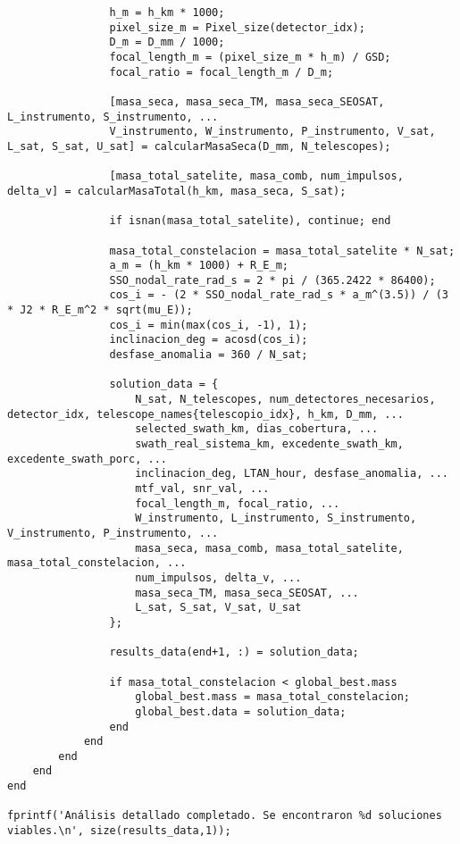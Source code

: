 \begin{verbatim}
                h_m = h_km * 1000;
                pixel_size_m = Pixel_size(detector_idx);
                D_m = D_mm / 1000;
                focal_length_m = (pixel_size_m * h_m) / GSD;
                focal_ratio = focal_length_m / D_m;

                [masa_seca, masa_seca_TM, masa_seca_SEOSAT, L_instrumento, S_instrumento, ...
                V_instrumento, W_instrumento, P_instrumento, V_sat, L_sat, S_sat, U_sat] = calcularMasaSeca(D_mm, N_telescopes);

                [masa_total_satelite, masa_comb, num_impulsos, delta_v] = calcularMasaTotal(h_km, masa_seca, S_sat);

                if isnan(masa_total_satelite), continue; end

                masa_total_constelacion = masa_total_satelite * N_sat;
                a_m = (h_km * 1000) + R_E_m;
                SSO_nodal_rate_rad_s = 2 * pi / (365.2422 * 86400);
                cos_i = - (2 * SSO_nodal_rate_rad_s * a_m^(3.5)) / (3 * J2 * R_E_m^2 * sqrt(mu_E));
                cos_i = min(max(cos_i, -1), 1);
                inclinacion_deg = acosd(cos_i);
                desfase_anomalia = 360 / N_sat;
                
                solution_data = {
                    N_sat, N_telescopes, num_detectores_necesarios, detector_idx, telescope_names{telescopio_idx}, h_km, D_mm, ...
                    selected_swath_km, dias_cobertura, ...
                    swath_real_sistema_km, excedente_swath_km, excedente_swath_porc, ...
                    inclinacion_deg, LTAN_hour, desfase_anomalia, ...
                    mtf_val, snr_val, ...
                    focal_length_m, focal_ratio, ...
                    W_instrumento, L_instrumento, S_instrumento, V_instrumento, P_instrumento, ...
                    masa_seca, masa_comb, masa_total_satelite, masa_total_constelacion, ...
                    num_impulsos, delta_v, ...
                    masa_seca_TM, masa_seca_SEOSAT, ...
                    L_sat, S_sat, V_sat, U_sat
                };
                
                results_data(end+1, :) = solution_data;

                if masa_total_constelacion < global_best.mass
                    global_best.mass = masa_total_constelacion;
                    global_best.data = solution_data;
                end
            end
        end
    end
end

fprintf('Análisis detallado completado. Se encontraron %d soluciones viables.\n', size(results_data,1));


\end{verbatim}
